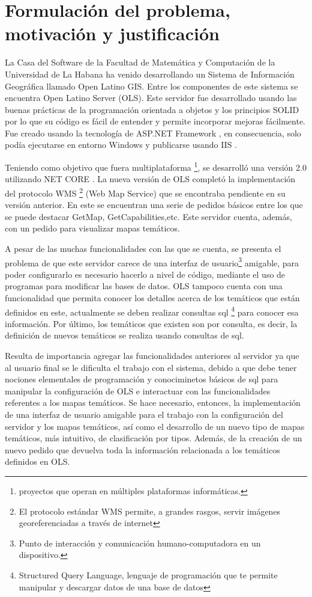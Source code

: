 \section{Formulaci\'on del problema, motivaci\'on y justificaci\'on}

La Casa del Software de la Facultad de Matem\'atica y Computaci\'on de la Universidad de La Habana ha venido desarrollando un Sistema de Informaci\'on Geogr\'afica llamado Open Latino GIS. Entre los componentes de este sistema se encuentra Open Latino Server (OLS). Este servidor fue desarrollado usando las buenas pr\'acticas de la programaci\'on orientada a objetos \cite{OO} y los principios SOLID \cite{solid} por lo que su c\'odigo es f\'acil de entender y permite incorporar mejoras f\'acilmente. Fue creado usando la tecnolog\'ia de ASP.NET Framework \cite{aspnet}, en consecuencia, solo pod\'ia ejecutarse en entorno Windows y publicarse usando IIS \cite{iis}.

Teniendo como objetivo que fuera multiplataforma \footnote{proyectos que operan en m\'ultiples plataformas inform\'aticas.}, se desarroll\'o una versi\'on 2.0 utilizando NET CORE \cite{netcore}. La nueva versi\'on de OLS complet\'o la implementaci\'on del protocolo WMS \footnote{El protocolo est\'andar WMS permite, a grandes rasgos, servir im\'agenes georeferenciadas a trav\'es de internet} (Web Map Service) \cite{wms} que se encontraba pendiente en su versi\'on anterior. En este se encuentran una serie de pedidos b\'asicos entre los que se puede destacar GetMap, GetCapabilities,etc. Este servidor cuenta, adem\'as, con un pedido para visualizar mapas tem\'aticos.

A pesar de las muchas funcionalidades con las que se cuenta, se presenta el problema de que este servidor carece de una interfaz de usuario\footnote{Punto de interacci\'on y comunicaci\'on humano-computadora en un dispositivo.} amigable, para poder configurarlo es necesario hacerlo a nivel de c\'odigo, mediante el uso de programas para modificar las bases de datos. OLS tampoco cuenta con una funcionalidad que permita conocer los detalles acerca de los tem\'aticos que est\'an definidos en este, actualmente se deben realizar consultas sql \footnote{Structured Query Language, lenguaje de programaci\'on que te permite manipular y descargar datos de una base de datos} para conocer esa informaci\'on. Por \'ultimo, los tem\'aticos que existen son por consulta, es decir, la definici\'on de nuevos tem\'aticos se realiza usando consultas de sql.

Resulta de importancia agregar las funcionalidades anteriores al servidor ya que al usuario final se le dificulta el trabajo con el sistema, debido a que debe tener nociones elementales de programaci\'on y conociminetos b\'asicos de sql para manipular la configuraci\'on de OLS e interactuar con las funcionalidades referentes a los mapas tem\'aticos. Se hace necesario, entonces, la implementaci\'on de una interfaz de usuario amigable para el trabajo con la configuraci\'on del servidor y los mapas tem\'aticos, as\'i como el desarrollo de un nuevo tipo de mapas tem\'aticos, m\'as intuitivo, de clasificaci\'on por tipos. Adem\'as, de la creaci\'on de un nuevo pedido que devuelva toda la informaci\'on relacionada a los tem\'aticos definidos en OLS.

